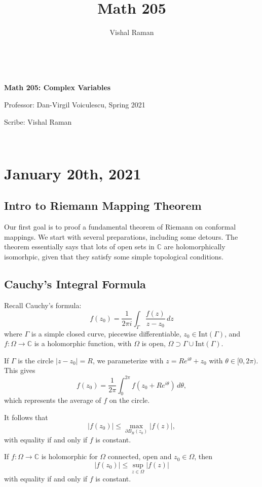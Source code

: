 \documentclass[12pt]{scrartcl}
\newcommand{\C}{\mathbb C}
\begin{document}
\title{Math 205}
\author{Vishal Raman}
\thispagestyle{empty}
$ $
\vfill
\begin{center}

\centerline{\huge \textbf{Math 205: Complex Variables} } 
\centerline{Professor: Dan-Virgil Voiculescu, Spring 2021}
\centerline{Scribe: Vishal Raman}
\end{center}
\vfill
$ $
\newpage
\thispagestyle{empty}
\tableofcontents
\newpage
\section{January 20th, 2021}
\subsection{Intro to Riemann Mapping Theorem}
Our first goal is to proof a fundamental theorem of Riemann on conformal mappings.  We start with several preparations, including some detours.  The theorem essentially says that lots of open sets in $\C$ are holomorphically isomorhpic, given that they satisfy some simple topological conditions.  

\subsection{Cauchy's Integral Formula}
Recall Cauchy's formula:
$$f(z_0) = \frac{1}{2\pi i} \int_{\Gamma} \frac{f(z)}{z - z_0} \,dz$$
where $\Gamma$ is a simple closed curve, piecewise differentiable, $z_0 \in \text{Int}(\Gamma)$, and $f : \Omega \to \C$ is a holomorphic function, with $\Omega$ is open, $\Omega \supset \Gamma \cup \text{Int}(\Gamma)$.

If $\Gamma$ is the circle $|z - z_0| = R$, we parameterize with $z = Re^{i\theta} + z_0$ with $\theta \in [0, 2\pi)$.  This gives
$$f(z_0) = \frac{1}{2\pi} \int_{0}^{2\pi} f(z_0 + Re^{i\theta})\,d\theta,$$
which represents the average of $f$ on the circle.  

It follows that 
$$|f(z_0)| \le \max_{\partial B_R(z_0)} |f(z)|,$$
with equality if and only if $f$ is constant.  

If $f: \Omega \to \C$ is holomorphic for $\Omega$ connected, open and $z_0 \in \Omega$, then
$$|f(z_0)|\le \sup_{z \in \Omega} |f(z)|$$
with equality if and only if $f$ is constant.  
\end{document}
